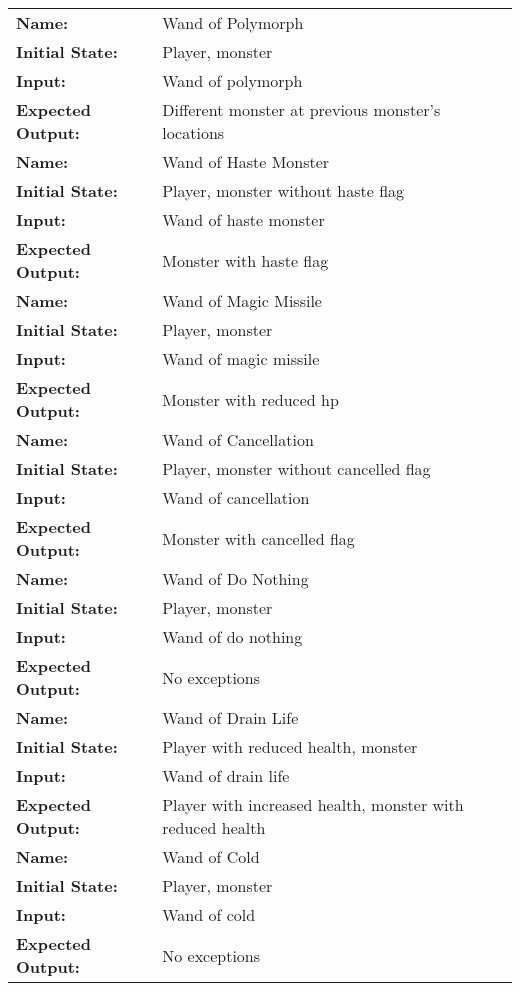 \documentclass[12pt, titlepage]{article}
\begin{document}
\begin{center}
\begin{longtable}{ l | p{10cm} }
				\hline
				\textbf{Name:} & Wand of Polymorph\\
				\textbf{Initial State:} & Player, monster\\
				\textbf{Input:} & Wand of polymorph\\
				\textbf{Expected Output:} & Different monster at previous monster's locations\\
				\hline
				\textbf{Name:} & Wand of Haste Monster\\
				\textbf{Initial State:} & Player, monster without haste flag\\
				\textbf{Input:} & Wand of haste monster\\
				\textbf{Expected Output:} & Monster with haste flag\\
				\hline
				\textbf{Name:} & Wand of Magic Missile\\
				\textbf{Initial State:} & Player, monster\\
				\textbf{Input:} & Wand of magic missile\\
				\textbf{Expected Output:} & Monster with reduced hp\\
				\hline
				\textbf{Name:} & Wand of Cancellation\\
				\textbf{Initial State:} & Player, monster without cancelled flag\\
				\textbf{Input:} & Wand of cancellation\\
				\textbf{Expected Output:} & Monster with cancelled flag\\
				\hline
				\textbf{Name:} & Wand of Do Nothing\\
				\textbf{Initial State:} & Player, monster\\
				\textbf{Input:} & Wand of do nothing\\
				\textbf{Expected Output:} & No exceptions\\
				\hline
				\textbf{Name:} & Wand of Drain Life\\
				\textbf{Initial State:} & Player with reduced health, monster\\
				\textbf{Input:} & Wand of drain life\\
				\textbf{Expected Output:} & Player with increased health, monster with reduced health\\
				\hline
				\textbf{Name:} & Wand of Cold\\
				\textbf{Initial State:} & Player, monster\\
				\textbf{Input:} & Wand of cold\\
				\textbf{Expected Output:} & No exceptions\\

\end{longtable}
\end{center}
\end{document}
